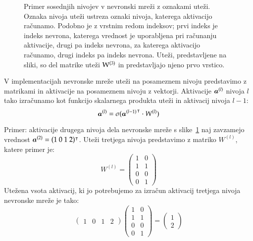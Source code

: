 \begin{figure}
\caption{Primer sosednjih nivojev v nevronski mreži z oznakami uteži. Oznaka nivoja uteži ustreza oznaki nivoja, katerega aktivacijo računamo. Podobno je z vrstnim redom indeksov; prvi indeks je indeks nevrona, katerega vrednost je uporabljena pri računanju aktivacije, drugi pa indeks nevrona, za katerega aktivacijo računamo, drugi indeks pa indeks nevrona. Uteži, predstavljene na sliki, so del matrike uteži ${\rm W}^{(3)}$ in predstavljajo njeno prvo vrstico.}
\label{f-nn-utezi}
\end{figure}

V implementacijah nevronske mreže uteži na posameznem nivoju predstavimo z matrikami in aktivacije na posameznem nivoju z vektorji. Aktivacije $\boldsymbol{a}^{(l)}$ nivoja $l$ tako izračunamo kot funkcijo skalarnega produkta uteži in aktivacij nivoja $l-1$:
\begin{equation}
\boldsymbol{a}^{(l)} = \sigma({\boldsymbol{a}^{(l-1)}}^{\intercal} \cdot W^{(l)} )
\end{equation}

\noindent Primer: aktivacije drugega nivoja dela nevronske mreže s slike~\ref{f-nn-utezi} naj zavzamejo vrednost $\boldsymbol{a}^{(2)}=(1\ 0\ 1\ 2)^{\intercal}$. Uteži tretjega nivoja predstavimo z matriko $W^{(l)}$, katere primer je:
\[
W^{(l)} = \begin{pmatrix} 1 & 0 \\ 1 & 1 \\ 0 & 0 \\ 0 & 1 \end{pmatrix}
\]
\noindent Utežena vsota aktivacij, ki jo potrebujemo za izračun aktivacij tretjega nivoja nevronske mreže je tako:
\[
\begin{pmatrix}1 & 0 & 1 & 2\end{pmatrix}
\begin{pmatrix} 1 & 0 \\ 1 & 1 \\ 0 & 0 \\ 0 & 1 \end{pmatrix} = 
\begin{pmatrix}1 \\ 2\end{pmatrix}
\]

